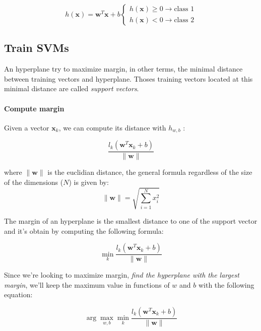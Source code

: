\begin{equation}
	h(\mathbf x) = \mathbf w^T\mathbf x + b \begin{cases}h(\mathbf x)\geq 0\to \text{class 1} \\h(\mathbf x)< 0\to \text{class 2}\end{cases}
\end{equation}

\subsection{Train SVMs}

An hyperplane try to maximize margin, in other terms, the minimal distance between training vectors and hyperplane. Thoses training vectors located at this minimal distance are called \textit{support vectors}.

\paragraph{Compute margin}

Given a vector $\mathbf x_k$, we can compute its distance with $h_{w,b}$ :

\begin{equation}
	\frac{l_k(\mathbf w^T\mathbf x_k + b)}{\lVert \mathbf w \rVert}
\end{equation}

where $\lVert \mathbf w \rVert$ is the euclidian distance, the general formula regardless of the size of the dimensions ($N$) is given by:
\begin{equation}
	\lVert \mathbf w \rVert = \sqrt{\sum_{i=1}^N x_i^2}
\end{equation}

The margin of an hyperplane is the smallest distance to one of the support vector and it's obtain by computing the following formula:

\begin{equation}
	\min_k \frac{l_k(\mathbf w^T\mathbf x_k + b)}{\lVert \mathbf w \rVert}
\end{equation}

Since we're looking to maximize margin, \textit{find the hyperplane with the largest margin}, we'll keep the maximum value in functions of $w$ and $b$ with the following equation:

\begin{equation}
	\arg\max_{w,b}\min_k \frac{l_k(\mathbf w^T\mathbf x_k + b)}{\lVert \mathbf w \rVert}
\end{equation}

